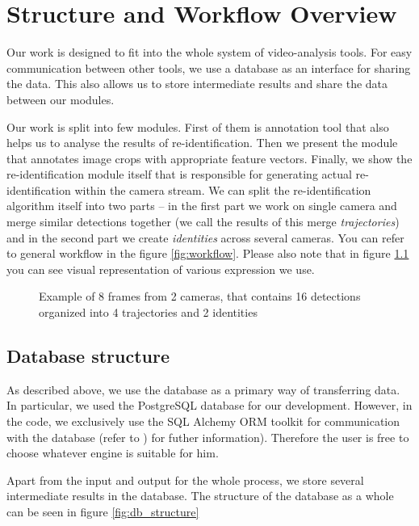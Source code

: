 \chapter{Structure and Workflow Overview}

Our work is designed to fit into the whole system of video-analysis tools. For easy communication
between other tools, we use a database as an interface for sharing the data. This also allows us to
store intermediate results and share the data between our modules.

Our work is split into few modules. First of them is annotation tool that also helps us to analyse the results of re-identification.
Then we present the module that annotates image crops with appropriate feature vectors.
Finally, we show the re-identification module itself that is responsible for generating actual re-identification within the camera stream. We can split the re-identification
algorithm itself into two parts -- in the first part we work on single camera and
merge similar detections together (we call the results of this merge \emph{trajectories})
and in the second part we create \emph{identities} across several cameras. You can
refer to general workflow in the figure \ref{fig:workflow}. Please also note that in
figure \ref{fig:visual_representation} you can see visual representation of various
expression we use.



\begin{figure}
    \centering
    \def\svgwidth{\columnwidth}
    
    \caption{Example of 8 frames from 2 cameras, that contains 16 detections organized into 4 trajectories and 2 identities}
    \label{fig:visual_representation}
\end{figure}


\section{Database structure}

As described above, we use the database as a primary way of transferring data. In particular, we used the PostgreSQL database
for our development. However, in the code, we exclusively use the SQL Alchemy ORM
toolkit for communication with the database (refer to \cite{sqlalchemy}) for futher 
information). Therefore the user is free to choose whatever engine is suitable for him.

Apart from the input and output for the whole process, we store several intermediate results in the database. The structure
of the database as a whole can be seen in figure \ref{fig:db_structure}

